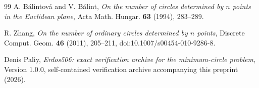 \begin{thebibliography}{99}
A. B\'alintov\'a and V. B\'alint,
\emph{On the number of circles determined by $n$ points in the Euclidean plane},
Acta Math. Hungar. \textbf{63} (1994), 283--289.

R. Zhang,
\emph{On the number of ordinary circles determined by $n$ points},
Discrete Comput. Geom. \textbf{46} (2011), 205--211,
doi:10.1007/s00454-010-9286-8.

Denis Paliy,
\emph{Erdos506: exact verification archive for the minimum-circle problem},
Version 1.0.0, self-contained verification archive accompanying this preprint (2026).

\end{thebibliography}

